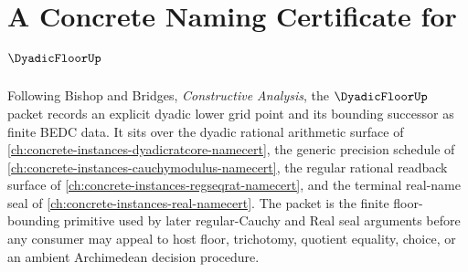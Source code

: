 \chapter{A Concrete Naming Certificate for $\DyadicFloorUp$}
\label{ch:concrete-instances-dyadicfloor-namecert}

Following Bishop and Bridges, \emph{Constructive Analysis}, the $\DyadicFloorUp$ packet records an explicit dyadic lower grid point and its bounding successor as finite BEDC data. It sits over the dyadic rational arithmetic surface of \autoref{ch:concrete-instances-dyadicratcore-namecert}, the generic precision schedule of \autoref{ch:concrete-instances-cauchymodulus-namecert}, the regular rational readback surface of \autoref{ch:concrete-instances-regseqrat-namecert}, and the terminal real-name seal of \autoref{ch:concrete-instances-real-namecert}. The packet is the finite floor-bounding primitive used by later regular-Cauchy and Real seal arguments before any consumer may appeal to host floor, trichotomy, quotient equality, choice, or an ambient Archimedean decision procedure.

